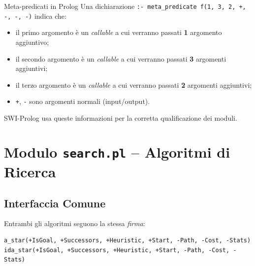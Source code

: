 \documentclass[12pt,a4paper]{article}
\begin{document}
\begin{defbox}{Meta-predicati in Prolog}
Una dichiarazione \texttt{:- meta\_predicate f(1, 3, 2, +, -, -, -)} indica che:
\begin{itemize}[noitemsep]
  \item il primo argomento è un \emph{callable} a cui verranno passati \textbf{1} argomento aggiuntivo;
  \item il secondo argomento è un \emph{callable} a cui verranno passati \textbf{3} argomenti aggiuntivi;
  \item il terzo argomento è un \emph{callable} a cui verranno passati \textbf{2} argomenti aggiuntivi;
  \item \texttt{+}, \texttt{-} sono argomenti normali (input/output).
\end{itemize}
SWI-Prolog usa queste informazioni per la corretta qualificazione dei moduli.
\end{defbox}

\section{Modulo \texttt{search.pl} -- Algoritmi di Ricerca}

\subsection{Interfaccia Comune}

Entrambi gli algoritmi seguono la stessa \emph{firma}:

\begin{lstlisting}
a_star(+IsGoal, +Successors, +Heuristic, +Start, -Path, -Cost, -Stats)
ida_star(+IsGoal, +Successors, +Heuristic, +Start, -Path, -Cost, -Stats)
\end{lstlisting}
\end{document}
